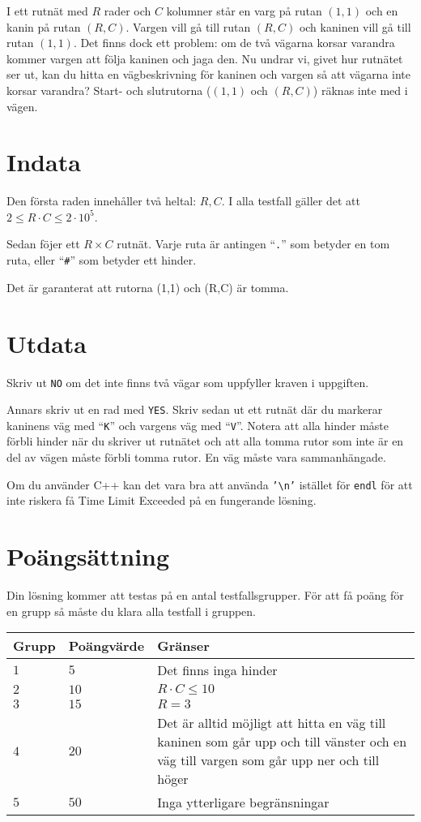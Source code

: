 I ett rutnät med $R$ rader och $C$ kolumner står en varg på rutan $(1, 1)$ och en kanin på rutan $(R, C)$.
Vargen vill gå till rutan $(R, C)$ och kaninen vill gå till rutan $(1, 1)$.
Det finns dock ett problem: om de två vägarna korsar varandra kommer vargen att följa kaninen och jaga den.
Nu undrar vi, givet hur rutnätet ser ut, kan du hitta en vägbeskrivning för kaninen och vargen så att vägarna inte korsar varandra?
Start- och slutrutorna ($(1, 1)$ och $(R, C)$) räknas inte med i vägen.

\section*{Indata}
Den första raden innehåller två heltal: $R, C$. I alla testfall gäller det att $2 \leq R \cdot C \leq 2 \cdot 10^5$.

Sedan föjer ett $R \times C$ rutnät. Varje ruta är antingen ``\texttt{.}'' som betyder en tom ruta, eller ``\texttt{\#}'' som betyder ett hinder.

Det är garanterat att rutorna (1,1) och (R,C) är tomma.

\section*{Utdata}
Skriv ut \texttt{NO} om det inte finns två vägar som uppfyller kraven i uppgiften.

Annars skriv ut en rad med \texttt{YES}.
Skriv sedan ut ett rutnät där du markerar kaninens väg med ``\texttt{K}'' och vargens väg med ``\texttt{V}''.
Notera att alla hinder måste förbli hinder när du skriver ut rutnätet och att alla tomma rutor som inte är en del av vägen måste förbli tomma rutor.
En väg måste vara sammanhängade.

Om du använder C++ kan det vara bra att använda \texttt{'\textbackslash{}n'} istället för \texttt{endl} för att inte riskera få Time Limit Exceeded på en fungerande lösning.

\section*{Poängsättning}
Din lösning kommer att testas på en antal testfallsgrupper.
För att få poäng för en grupp så måste du klara alla testfall i gruppen.

\noindent
\begin{tabular}{| l | l | p{12cm} |}
  \hline
  Grupp & Poängvärde & Gränser \\ \hline
  $1$   & $5$        & Det finns inga hinder\\ \hline
  $2$   & $10$       & $R \cdot C \leq 10$  \\ \hline
  $3$   & $15$       & $R= 3$  \\ \hline
  $4$   & $20$       & Det är alltid möjligt att hitta en väg till kaninen som går upp och till vänster och en väg till vargen som går upp ner och till höger  \\ \hline
  $5$   & $50$       & Inga ytterligare begränsningar  \\ \hline
\end{tabular}

